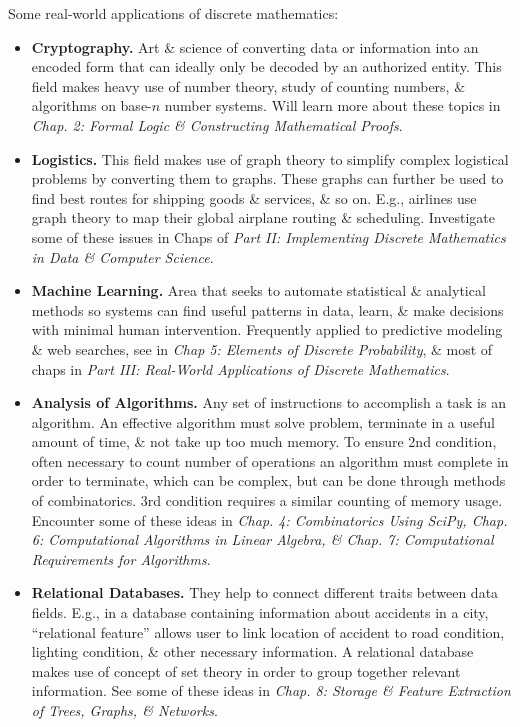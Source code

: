\documentclass{article}
\begin{document}
\begin{enumerate}
\begin{itemize}
\begin{itemize}
			Some real-world applications of discrete mathematics:
			\begin{itemize}
				\item {\bf Cryptography.} Art \& science of converting data or information into an encoded form that can ideally only be decoded by an authorized entity. This field makes heavy use of number theory, study of counting numbers, \& algorithms on base-$n$ number systems. Will learn more about these topics in {\it Chap. 2: Formal Logic \& Constructing Mathematical Proofs}.
				\item {\bf Logistics.} This field makes use of graph theory to simplify complex logistical problems by converting them to graphs. These graphs can further be used to find best routes for shipping goods \& services, \& so on. E.g., airlines use graph theory to map their global airplane routing \& scheduling. Investigate some of these issues in Chaps of {\it Part II: Implementing Discrete Mathematics in Data \& Computer Science}.
				\item {\bf Machine Learning.} Area that seeks to automate statistical \& analytical methods so systems can find useful patterns in data, learn, \& make decisions with minimal human intervention. Frequently applied to predictive modeling \& web searches, see in {\it Chap 5: Elements of Discrete Probability}, \& most of chaps in {\it Part III: Real-World Applications of Discrete Mathematics}.
				\item {\bf Analysis of Algorithms.} Any set of instructions to accomplish a task is an algorithm. An effective algorithm must solve problem, terminate in a useful amount of time, \& not take up too much memory. To ensure 2nd condition, often necessary to count number of operations an algorithm must complete in order to terminate, which can be complex, but can be done through methods of combinatorics. 3rd condition requires a similar counting of memory usage. Encounter some of these ideas in {\it Chap. 4: Combinatorics Using SciPy, Chap. 6: Computational Algorithms in Linear Algebra, \& Chap. 7: Computational Requirements for Algorithms}.
				\item {\bf Relational Databases.} They help to connect different traits between data fields. E.g., in a database containing information about accidents in a city, ``relational feature'' allows user to link location of accident to road condition, lighting condition, \& other necessary information. A relational database makes use of concept of set theory in order to group together relevant information. See some of these ideas in {\it Chap. 8: Storage \& Feature Extraction of Trees, Graphs, \& Networks}.

\end{itemize}
\end{itemize}
\end{itemize}
\end{enumerate}
\end{document}
